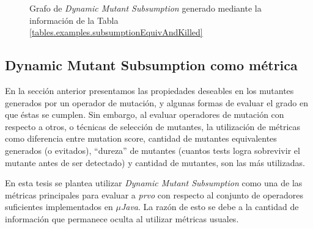 \begin{figure}
	\begin{center}
		\usetikzlibrary{positioning}
	\end{center}
	\caption{Grafo de \emph{Dynamic Mutant Subsumption} generado mediante la informaci\'on de la Tabla \ref{tables.examples.subsumptionEquivAndKilled}}
	\label{figures.examples.dynamicSubsumptionGraph}
\end{figure}

\subsection{Dynamic Mutant Subsumption como m\'etrica}
\label{sec:preliminares.mutation.whysubsumption}

En la secci\'on anterior presentamos las propiedades deseables en los mutantes generados por un operador de mutaci\'on, y algunas formas de evaluar el grado en que \'estas se cumplen. Sin embargo, al evaluar operadores de mutaci\'on con respecto a otros, o t\'ecnicas de selecci\'on de mutantes, la utilizaci\'on de m\'etricas como diferencia entre mutation score, cantidad de mutantes equivalentes generados (o evitados), ``dureza'' de mutantes (cuantos tests logra sobrevivir el mutante antes de ser detectado) y cantidad de mutantes, son las m\'as utilizadas.

En esta tesis se plantea utilizar \emph{Dynamic Mutant Subsumption} como una de las m\'etricas principales para evaluar a \emph{prvo} con respecto al conjunto de operadores suficientes implementados en \emph{$\mu$Java}. La raz\'on de esto se debe a la cantidad de informaci\'on que permanece oculta al utilizar m\'etricas usuales.

